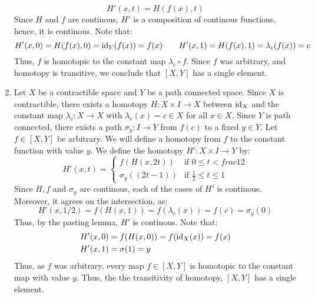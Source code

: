 \documentclass[12pt]{article}
\begin{document}
\begin{solution}
\begin{enumerate}
        \[ H'(x, t) = H(f(x), t)\]
        Since $H$ and $f$ are continous, $H'$ is a composition of continous functions, hence, it is continous. Note that: 
        \[ H'(x, 0) = H(f(x), 0) = \operatorname{id}_Y(f(x)) = f(x) \qquad H'(x, 1) = H(f(x), 1) = \lambda_c(f(x)) = c \]
        Thus, $f$ is homotopic to the constant map $\lambda_c \circ f$. Since $f$ was arbitrary, and homotopy is transitive, we conclude that $[X,Y]$ has a single element. 
        \item Let $X$ be a contractible space and $Y$ be a path connected space. Since $X$ is contractible, there exists a homotopy $H: X \times I \to X$ between $\operatorname{id}_X$ and the constant map $\lambda_c: X \to X$ with $\lambda_c(x) = c \in X$ for all $x \in X$. Since $Y$ is path connected, there exists a path $\sigma_y: I \to Y$ from $f(c)$ to a fixed $y \in Y$. Let $f \in [X,Y]$ be arbitrary. We will define a homotopy from $f$ to the constant function with value $y$. \bbni
        We define the homotopy $H': X \times I \to Y$ by:
        \[ H'(x, t) = \begin{cases}
            f(H(x, 2t)) & \text{if } 0 \leq t < frac{1}{2} \\
            \sigma_y((2t - 1)) & \text{if } \frac{1}{2} \leq t \leq 1
        \end{cases} \]
        Since $H, f$ and $\sigma_y$ are continous, each of the cases of $H'$ is continous. Moreover, it agrees on the intersection, as:
        \[ H'(x, 1/2) = f(H(x, 1)) = f(\lambda_c(x)) = f(c) = \sigma_y(0)  \]
        Thus, by the pasting lemma, $H'$ is continous. \bbni
        Note that:
        \begin{align*}
            H'(x, 0) &= f(H(x, 0)) = f(\operatorname{id}_X(x)) = f(x) \\
            H'(x, 1) &= \sigma(1) = y
        \end{align*}
        Thus, as $f$ was arbitrary, every map $f \in [X, Y]$ is homotopic to the constant map with value $y$. Thus, the the transitivity of homotopy, $[X,Y]$ has a single element. 

    \end{enumerate}
\end{solution}
\end{document}
